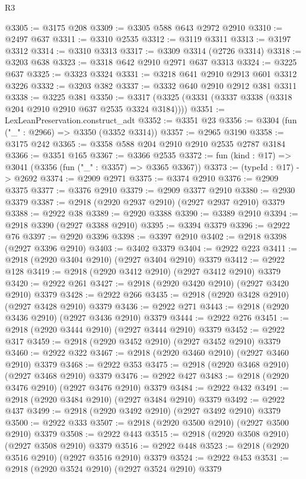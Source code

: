 \begin{lexlean}{R3}
\begin{coremodule}
@3305 := @3175 @208
@3309 := @3305 @588 @643 @2972 @2910
@3310 := @2497 @637
@3311 := @3310 @2535
@3312 := @3119 @3311
@3313 := @3197 @3312
@3314 := @3310 @3313
@3317 := @3309 @3314 (@2726 @3314)
@3318 := @3203 @638
@3323 := @3318 @642 @2910 @2971 @637 @3313
@3324 := @3225 @637
@3325 := @3323 @3324
@3331 := @3218 @641 @2910 @2913 @601 @3312 @3226
@3332 := @3203 @382
@3337 := @3332 @640 @2910 @2912 @381 @3311
@3338 := @3225 @381
@3350 := @3317 (@3325 (@3331 (@3337 @3338 (@3318 @204 @2910 @2910 @637 @2535 @3324 @3184))))
@3351 := LexLeanPreservation.construct_adt
@3352 := @3351 @23
@3356 := @3304 (fun ("_" : @2966) => @3350 (@3352 @3314))
@3357 := @2965 @3190
@3358 := @3175 @242
@3365 := @3358 @588 @204 @2910 @2910 @2535 @2787 @3184
@3366 := @3351 @165
@3367 := @3366 @2535
@3372 := fun (kind : @17) => @3041 (@3356 (fun ("_" : @3357) => @3365 @3367))
@3373 := (typeId : @17) -> @2692
@3374 := @2909 @2971
@3375 := @3374 @2910
@3376 := @2909 @3375
@3377 := @3376 @2910
@3379 := @2909 @3377 @2910
@3380 := @2930 @3379
@3387 := @2918 (@2920 @2937 @2910) (@2927 @2937 @2910) @3379
@3388 := @2922 @38
@3389 := @2920 @3388
@3390 := @3389 @2910
@3394 := @2918 @3390 (@2927 @3388 @2910)
@3395 := @3394 @3379
@3396 := @2922 @76
@3397 := @2920 @3396
@3398 := @3397 @2910
@3402 := @2918 @3398 (@2927 @3396 @2910)
@3403 := @3402 @3379
@3404 := @2922 @223
@3411 := @2918 (@2920 @3404 @2910) (@2927 @3404 @2910) @3379
@3412 := @2922 @128
@3419 := @2918 (@2920 @3412 @2910) (@2927 @3412 @2910) @3379
@3420 := @2922 @261
@3427 := @2918 (@2920 @3420 @2910) (@2927 @3420 @2910) @3379
@3428 := @2922 @266
@3435 := @2918 (@2920 @3428 @2910) (@2927 @3428 @2910) @3379
@3436 := @2922 @271
@3443 := @2918 (@2920 @3436 @2910) (@2927 @3436 @2910) @3379
@3444 := @2922 @276
@3451 := @2918 (@2920 @3444 @2910) (@2927 @3444 @2910) @3379
@3452 := @2922 @317
@3459 := @2918 (@2920 @3452 @2910) (@2927 @3452 @2910) @3379
@3460 := @2922 @322
@3467 := @2918 (@2920 @3460 @2910) (@2927 @3460 @2910) @3379
@3468 := @2922 @353
@3475 := @2918 (@2920 @3468 @2910) (@2927 @3468 @2910) @3379
@3476 := @2922 @427
@3483 := @2918 (@2920 @3476 @2910) (@2927 @3476 @2910) @3379
@3484 := @2922 @432
@3491 := @2918 (@2920 @3484 @2910) (@2927 @3484 @2910) @3379
@3492 := @2922 @437
@3499 := @2918 (@2920 @3492 @2910) (@2927 @3492 @2910) @3379
@3500 := @2922 @333
@3507 := @2918 (@2920 @3500 @2910) (@2927 @3500 @2910) @3379
@3508 := @2922 @443
@3515 := @2918 (@2920 @3508 @2910) (@2927 @3508 @2910) @3379
@3516 := @2922 @448
@3523 := @2918 (@2920 @3516 @2910) (@2927 @3516 @2910) @3379
@3524 := @2922 @453
@3531 := @2918 (@2920 @3524 @2910) (@2927 @3524 @2910) @3379

\end{coremodule}
\end{lexlean}
